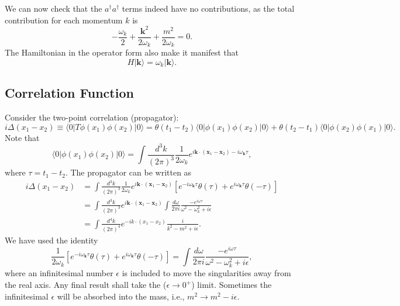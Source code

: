 \documentclass[aps,prb,superscriptaddress,nofootinbib]{revtex4}
\begin{document}
We can now check that the $a^\dagger a^\dagger$ terms indeed have no contributions, as the total contribution for each momentum $k$ is
\begin{equation}
	-\frac{\omega_k}{2} + \frac{\bm k^2}{2\omega_k} + \frac{m^2}{2\omega_k} = 0.
\end{equation}
The Hamiltonian in the operator form also make it manifest that
\begin{equation}
	H |\bm k\rangle = \omega_k |\bm k\rangle.
\end{equation}


\subsection{Correlation Function}
Consider the two-point correlation (propagator):
\begin{equation}
	i\Delta(x_1-x_2) \equiv \langle 0|T \phi(x_1) \phi(x_2) |0\rangle 
	= \theta(t_1-t_2) \langle 0|\phi(x_1) \phi(x_2) |0\rangle 
	+ \theta(t_2-t_1) \langle 0|\phi(x_2) \phi(x_1) |0\rangle.
\end{equation}
Note that
\begin{equation}
	\langle 0|\phi(x_1) \phi(x_2) |0\rangle
	= \int\frac{d^{3} k}{(2\pi)^{3}}\frac{1}{2\omega_k} e^{i\bm k\cdot (\bm x_1-\bm x_2)-i\omega_{\bm k}\tau},
\end{equation}
where $\tau =t_1-t_2$.
The propagator can be written as
\begin{equation}
\begin{aligned}
	i\Delta(x_1-x_2) 
	&= \int\frac{d^{3} k}{(2\pi)^{3}}\frac{1}{2\omega_k} e^{i\bm k\cdot (\bm x_1-\bm x_2)}\left[e^{-i\omega_{\bm k}\tau}\theta(\tau)+e^{i\omega_{\bm k}\tau}\theta(-\tau)\right] \\
	&= \int\frac{d^{3} k}{(2\pi)^{3}} e^{i\bm k\cdot (\bm x_1-\bm x_2)}\int \frac{d\omega}{2\pi i}\frac{-e^{i\omega\tau}}{\omega^2-\omega_k^2+i\epsilon} \\
	&= \int\frac{d^{4} k}{(2\pi)^{4}} e^{-i k\cdot (x_1-x_2)}\frac{i}{k^2-m^2+i\epsilon}.
\end{aligned}
\end{equation}
We have used the identity
\begin{equation*}
	\frac{1}{2\omega_k} \left[e^{-i\omega_{\bm k}\tau}\theta(\tau)+e^{i\omega_{\bm k}\tau}\theta(-\tau)\right] 
	= \int \frac{d\omega}{2\pi i} \frac{-e^{i\omega\tau}}{\omega^2-\omega_k^2+i\epsilon},
\end{equation*}
where an infinitesimal number $\epsilon$ is included to move the singularities away from the real axis.
Any final result shall take the ($\epsilon \rightarrow 0^+$) limit.
Sometimes the infinitesimal $\epsilon$ will be absorbed into the mass, i.e., $m^2 \rightarrow m^2-i\epsilon$.
\end{document}
